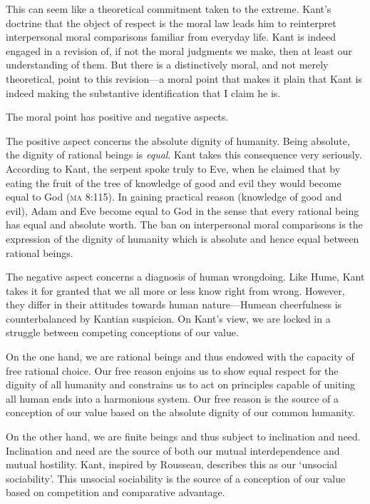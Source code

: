 \documentclass[a4paper,12pt]{article}
\begin{document}
This can seem like a theoretical commitment taken to the extreme. Kant's doctrine that the object of respect is the moral law leads him to reinterpret interpersonal moral comparisons familiar from everyday life. Kant is indeed engaged in a revision of, if not the moral judgments we make, then at least our understanding of them. But there is a distinctively moral, and not merely theoretical, point to this revision---a moral point that makes it plain that Kant is indeed making the substantive identification that I claim he is.

The moral point has positive and negative aspects.

The positive aspect concerns the absolute dignity of humanity. Being absolute, the dignity of rational beings is \emph{equal}. Kant takes this consequence very seriously. According to Kant, the serpent spoke truly to Eve, when he claimed that by eating the fruit of the tree of knowledge of good and evil they would become equal to God (\textsc{ma} 8:115). In gaining practical reason (knowledge of good and evil), Adam and Eve become equal to God in the sense that every rational being has equal and absolute worth. The ban on interpersonal moral comparisons is the expression of the dignity of humanity which is absolute and hence equal between rational beings.

The negative aspect concerns a diagnosis of human wrongdoing. Like Hume, Kant takes it for granted that we all more or less know right from wrong. However, they differ in their attitudes towards human nature---Humean cheerfulness is counterbalanced by Kantian suspicion. On Kant's view, we are locked in a struggle between competing conceptions of our value. 

On the one hand, we are rational beings and thus endowed with the capacity of free rational choice. Our free reason enjoins us to show equal respect for the dignity of all humanity and constrains us to act on principles capable of uniting all human ends into a harmonious system. Our free reason is the source of a conception of our value based on the absolute dignity of our common humanity. 

On the other hand, we are finite beings and thus subject to inclination and need. Inclination and need are the source of both our mutual interdependence and mutual hostility. Kant, inspired by Rousseau, describes this as our `unsocial sociability'. This unsocial sociability is the source of a conception of our value based on competition and comparative advantage. 
\end{document}
